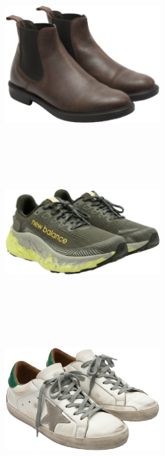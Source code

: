 \documentclass[10pt]{article}
\begin{document}
\begin{minipage}[c][59.33mm][c]{59.33mm}\centering
\includegraphics[width=59.33mm,height=59.33mm,keepaspectratio]{assets/shoes/brown-chelsea-boots.png}\
\end{minipage} \hspace*{6.00mm} \begin{minipage}[c][59.33mm][c]{59.33mm}\centering
\includegraphics[width=59.33mm,height=59.33mm,keepaspectratio]{assets/shoes/new-balance-large-sole-military-green.png}\
\end{minipage} \hspace*{6.00mm} \begin{minipage}[c][59.33mm][c]{59.33mm}\centering
\includegraphics[width=59.33mm,height=59.33mm,keepaspectratio]{assets/shoes/golden-goose-bianche-verdi.png}\
\end{minipage} \hspace*{6.00mm} \begin{minipage}[c][59.33mm][c]{59.33mm}\centering

\end{minipage}
\end{document}
